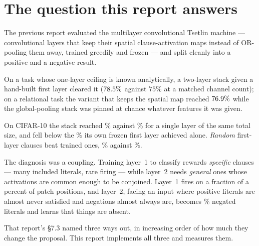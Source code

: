 \section{The question this report answers}
\label{sec:question}

The previous report evaluated the multilayer convolutional Tsetlin machine --- convolutional
layers that keep their spatial clause-activation maps instead of OR-pooling them away,
trained greedily and frozen --- and split cleanly into a positive and a negative result.

\begin{ttkey}
 On a task whose one-layer ceiling is known
analytically, a two-layer stack given a hand-built first layer cleared it
($78.5{}\%$ against $75\%$ at a matched channel count); on a relational
task the variant that keeps the spatial map reached $76.9{}\%$ while the
global-pooling stack was pinned at chance whatever features it was given.

 On CIFAR-10 the stack reached \accMctm{}\% against
\accSingleMatched{}\% for a single layer of the same total size, and fell below the
\accSingleLOne{}\% its own frozen first layer achieved alone. \emph{Random} first-layer
clauses beat trained ones, \accMctmRandom{}\% against \accMctm{}\%.
\end{ttkey}

The diagnosis was a coupling. Training layer~1 to classify rewards \emph{specific} clauses ---
many included literals, rare firing --- while layer~2 needs \emph{general} ones whose
activations are common enough to be conjoined. Layer~1 fires on a fraction of a percent of
patch positions, and layer~2, facing an input where positive literals are almost never
satisfied and negations almost always are, becomes \negMctm{}\% negated literals and learns
that things are absent.

That report's \S7.3 named three ways out, in increasing order of how much they change the proposal.
This report implements all three and measures them.


